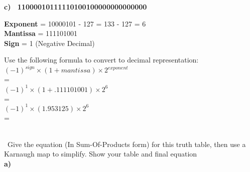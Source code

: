 \documentclass[12pt]{article}
\begin{document}
	
	
	
	
	\textbf{c) \ 11000010111110100100000000000000} \vspace{0.5cm}
	
	\noindent \textbf{Exponent} = 10000101 - 127 = 133 - 127 = 6 \\
	\textbf{Mantissa} = 111101001  \\
	\textbf{Sign} = 1 (Negative Decimal)  \vspace{0.1cm} \\
	
	
	\begin{center}
		
		Use the following formula to convert to decimal representation:  \vspace{0.5cm} \\
		
		$(-1)^{sign} \times (1 + mantissa) \times 2^{exponent} $ \\
		
		=  \\
		
		$(-1)^{1} \times (1 + .111101001) \times 2^{6} $  \\
		
		=  \\
		
		
		$(-1)^{1} \times (1.953125) \times 2^{6} $  \\
		
		=  \\
		
		 \vspace{0.7cm}  \\
		
	\end{center}
	
	
	
	\newpage
	
	
	
	
	
	\noindent {} 
	\ Give the equation (In Sum-Of-Products form) for this truth table, then use a Karnaugh map to simplify. Show your table and final equation \vspace{0.5cm} \\
	
	
	\textbf{a)}
	
\end{document}
